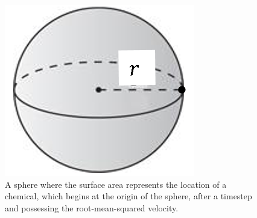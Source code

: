 \begin{supplementary}
\begin{figure}
    \centering
    \includegraphics{images/WCMpy/diffusion_sphere.png}
    \caption{
        A sphere where the surface area represents the location of a chemical, which begins at the origin of the sphere, after a timestep and possessing the root-mean-squared velocity.
    }
    \label{diffusion_sphere}
\end{figure}


\end{supplementary}
